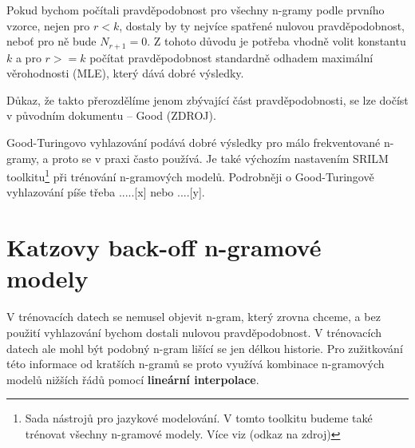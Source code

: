 \documentclass[12pt,a4paper]{report}
\begin{document}
Pokud bychom počítali pravděpodobnost pro všechny n-gramy podle prvního vzorce, nejen pro $r < k$, dostaly by ty nejvíce spatřené nulovou pravděpodobnost, neboť pro ně bude $N_{r+1} = 0$. Z tohoto důvodu je potřeba vhodně volit konstantu $k$ a pro $r >= k$ počítat pravděpodobnost standardně odhadem maximální věrohodnosti (MLE), který dává dobré výsledky.

Důkaz, že takto přerozdělíme jenom zbývající část pravděpodobnosti, se lze dočíst v původním dokumentu -- Good (ZDROJ).




Good-Turingovo vyhlazování podává dobré výsledky pro málo frekventované n-gramy, a proto se v praxi často používá. Je také výchozím nastavením SRILM toolkitu\footnote{Sada nástrojů pro jazykové modelování. V tomto toolkitu budeme také trénovat všechny n-gramové modely. Více viz (odkaz na zdroj)} při trénování n-gramových modelů. Podrobněji o Good-Turingově vyhlazování píše třeba .....[x] nebo ....[y].

\section{Katzovy back-off n-gramové modely}
V trénovacích datech se nemusel objevit n-gram, který zrovna chceme, a bez použití vyhlazování bychom dostali nulovou pravděpodobnost. V trénovacích datech ale mohl být podobný n-gram lišící se jen délkou historie. Pro zužitkování této informace od kratších n-gramů se proto využívá kombinace n-gramových modelů nižších řádů pomocí \textbf{lineární interpolace}. 
\end{document}

